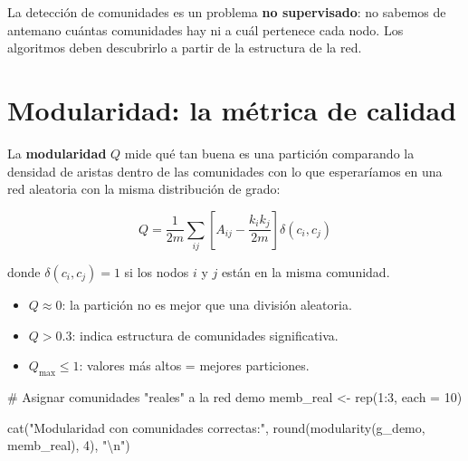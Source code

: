 \documentclass[
  letterpaper,
  DIV=11,
  numbers=noendperiod]{scrreprt}
\newenvironment{Shaded}{\begin{snugshade}}{\end{snugshade}}
\newcommand{\AttributeTok}[1]{\textcolor[rgb]{0.40,0.45,0.13}{#1}}
\newcommand{\CommentTok}[1]{\textcolor[rgb]{0.37,0.37,0.37}{#1}}
\newcommand{\DecValTok}[1]{\textcolor[rgb]{0.68,0.00,0.00}{#1}}
\newcommand{\FunctionTok}[1]{\textcolor[rgb]{0.28,0.35,0.67}{#1}}
\newcommand{\NormalTok}[1]{\textcolor[rgb]{0.00,0.23,0.31}{#1}}
\newcommand{\OtherTok}[1]{\textcolor[rgb]{0.00,0.23,0.31}{#1}}
\newcommand{\SpecialCharTok}[1]{\textcolor[rgb]{0.37,0.37,0.37}{#1}}
\newcommand{\StringTok}[1]{\textcolor[rgb]{0.13,0.47,0.30}{#1}}
\providecommand{\tightlist}{%
  \setlength{\itemsep}{0pt}\setlength{\parskip}{0pt}}
\begin{document}
\begin{tcolorbox}[enhanced jigsaw, toprule=.15mm, colframe=quarto-callout-tip-color-frame, coltitle=black, titlerule=0mm, colback=white, breakable, leftrule=.75mm, arc=.35mm, bottomtitle=1mm, toptitle=1mm, rightrule=.15mm, bottomrule=.15mm, left=2mm, title=\textcolor{quarto-callout-tip-color}{\faLightbulb}\hspace{0.5em}{💡 Concepto clave}, colbacktitle=quarto-callout-tip-color!10!white, opacityback=0, opacitybacktitle=0.6]

La detección de comunidades es un problema \textbf{no supervisado}: no
sabemos de antemano cuántas comunidades hay ni a cuál pertenece cada
nodo. Los algoritmos deben descubrirlo a partir de la estructura de la
red.

\end{tcolorbox}

\section{Modularidad: la métrica de
calidad}\label{modularidad-la-muxe9trica-de-calidad}

La \textbf{modularidad} \(Q\) mide qué tan buena es una partición
comparando la densidad de aristas dentro de las comunidades con lo que
esperaríamos en una red aleatoria con la misma distribución de grado:

\[
Q = \frac{1}{2m} \sum_{ij} \left[ A_{ij} - \frac{k_i k_j}{2m} \right] \delta(c_i, c_j)
\]

donde \(\delta(c_i, c_j) = 1\) si los nodos \(i\) y \(j\) están en la
misma comunidad.

\begin{itemize}
\tightlist
\item
  \(Q \approx 0\): la partición no es mejor que una división aleatoria.
\item
  \(Q > 0.3\): indica estructura de comunidades significativa.
\item
  \(Q_{\max} \leq 1\): valores más altos = mejores particiones.
\end{itemize}

\begin{Shaded}
\begin{Highlighting}[]
\CommentTok{\# Asignar comunidades "reales" a la red demo}
\NormalTok{memb\_real }\OtherTok{\textless{}{-}} \FunctionTok{rep}\NormalTok{(}\DecValTok{1}\SpecialCharTok{:}\DecValTok{3}\NormalTok{, }\AttributeTok{each =} \DecValTok{10}\NormalTok{)}

\FunctionTok{cat}\NormalTok{(}\StringTok{"Modularidad con comunidades correctas:"}\NormalTok{, }
    \FunctionTok{round}\NormalTok{(}\FunctionTok{modularity}\NormalTok{(g\_demo, memb\_real), }\DecValTok{4}\NormalTok{), }\StringTok{"}\SpecialCharTok{\textbackslash{}n}\StringTok{"}\NormalTok{)}
\end{Highlighting}
\end{Shaded}
\end{document}
